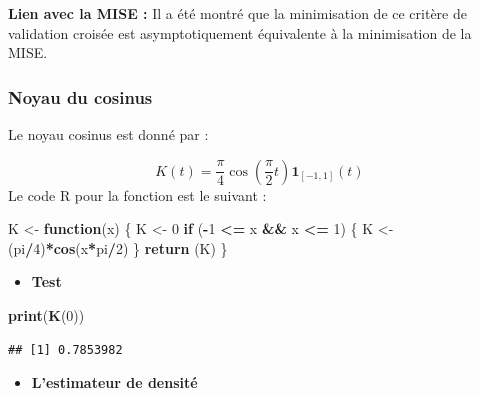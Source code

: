 \documentclass[
  12pt,
]{article}
\newenvironment{Shaded}{\begin{snugshade}}{\end{snugshade}}
\newcommand{\ControlFlowTok}[1]{\textcolor[rgb]{0.13,0.29,0.53}{\textbf{#1}}}
\newcommand{\DecValTok}[1]{\textcolor[rgb]{0.00,0.00,0.81}{#1}}
\newcommand{\FunctionTok}[1]{\textcolor[rgb]{0.13,0.29,0.53}{\textbf{#1}}}
\newcommand{\NormalTok}[1]{#1}
\newcommand{\OtherTok}[1]{\textcolor[rgb]{0.56,0.35,0.01}{#1}}
\newcommand{\SpecialCharTok}[1]{\textcolor[rgb]{0.81,0.36,0.00}{\textbf{#1}}}
\providecommand{\tightlist}{%
  \setlength{\itemsep}{0pt}\setlength{\parskip}{0pt}}
\begin{document}
\textbf{Lien avec la MISE :} Il a été montré que la minimisation de ce
critère de validation croisée est asymptotiquement équivalente à la
minimisation de la MISE.

\subsubsection{Noyau du cosinus}\label{noyau-du-cosinus}

Le noyau cosinus est donné par :

\[K(t) = \frac{\pi}{4} \cos\left(\frac{\pi}{2} t\right) \mathbf{1}_{[-1,1]}(t)\]
Le code R pour la fonction est le suivant :

\begin{Shaded}
\begin{Highlighting}[]
\NormalTok{K }\OtherTok{\textless{}{-}} \ControlFlowTok{function}\NormalTok{(x)}
\NormalTok{  \{}
\NormalTok{  K }\OtherTok{\textless{}{-}} \DecValTok{0}
  \ControlFlowTok{if}\NormalTok{ (}\SpecialCharTok{{-}}\DecValTok{1} \SpecialCharTok{\textless{}=}\NormalTok{ x }\SpecialCharTok{\&\&}\NormalTok{ x }\SpecialCharTok{\textless{}=} \DecValTok{1}\NormalTok{) \{}
\NormalTok{    K }\OtherTok{\textless{}{-}}\NormalTok{ (pi}\SpecialCharTok{/}\DecValTok{4}\NormalTok{)}\SpecialCharTok{*}\FunctionTok{cos}\NormalTok{(x}\SpecialCharTok{*}\NormalTok{pi}\SpecialCharTok{/}\DecValTok{2}\NormalTok{)}
\NormalTok{  \} }
  \FunctionTok{return}\NormalTok{ (K)}
\NormalTok{\}}
\end{Highlighting}
\end{Shaded}

\begin{itemize}
\tightlist
\item
  \textbf{Test}
\end{itemize}

\begin{Shaded}
\begin{Highlighting}[]
\FunctionTok{print}\NormalTok{(}\FunctionTok{K}\NormalTok{(}\DecValTok{0}\NormalTok{))}
\end{Highlighting}
\end{Shaded}

\begin{verbatim}
## [1] 0.7853982
\end{verbatim}

\begin{itemize}
\tightlist
\item
  \textbf{L'estimateur de densité}
\end{itemize}
\end{document}
